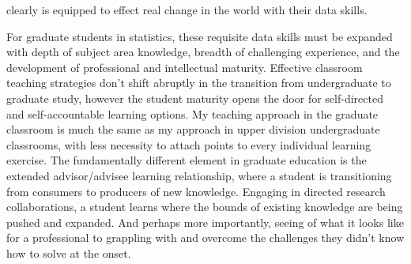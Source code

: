 \documentclass[letterpaper,12pt]{article}\usepackage[]{graphicx}\usepackage[]{color}
\begin{document}
clearly is equipped to effect real change in the world with their data skills.  

For graduate students in statistics, these requisite data skills must be expanded with depth of subject area knowledge, breadth of challenging experience, and the development of professional and intellectual maturity. Effective classroom teaching strategies don't shift abruptly in the transition from undergraduate to graduate study, however the student maturity opens the door for self-directed and self-accountable learning options. My teaching approach in the graduate classroom is much the same as my approach in upper division undergraduate classrooms, with less necessity to attach points to every individual learning exercise. The fundamentally different element in graduate education is the extended advisor/advisee learning relationship, where a student is transitioning from consumers to producers of new knowledge. Engaging in directed research collaborations, a student learns where the bounds of existing knowledge are being pushed and expanded. And perhaps more importantly, seeing of what it looks like for a professional to grappling with and overcome the challenges they didn't know how to solve at the onset.
\end{document}
